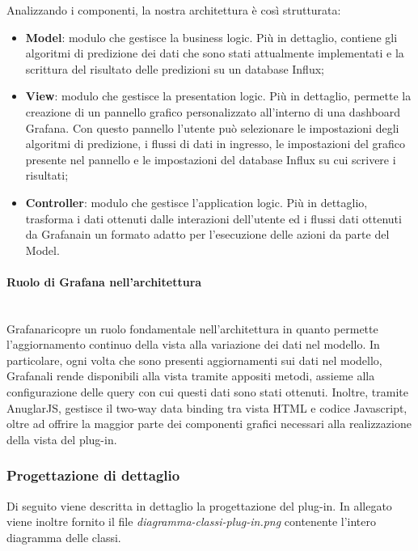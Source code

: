 Analizzando i componenti, la nostra architettura è così strutturata: 
\begin{itemize}
	\item \textbf{Model}: modulo che gestisce la business logic\glo. Più in dettaglio, contiene gli algoritmi di predizione dei dati che sono stati attualmente implementati e la scrittura del risultato delle predizioni su un database Influx;
	\item \textbf{View}: modulo che gestisce la presentation logic. Più in dettaglio, permette la creazione di un pannello grafico personalizzato all'interno di una dashboard Grafana\glo. Con questo pannello l'utente può selezionare le impostazioni degli algoritmi di predizione, i flussi di dati in ingresso, le impostazioni del grafico presente nel pannello e le impostazioni del database Influx su cui scrivere i risultati;
	\item \textbf{Controller}: modulo che gestisce l'application logic. Più in dettaglio, trasforma i dati ottenuti dalle interazioni dell'utente ed i flussi dati ottenuti da Grafana\glosp in un formato adatto per l'esecuzione delle azioni da parte del Model.
\end{itemize}
\paragraph{Ruolo di Grafana nell'architettura} \mbox{}\\ [1mm]
Grafana\glosp ricopre un ruolo fondamentale nell'architettura in quanto permette l'aggiornamento continuo della vista alla variazione dei dati nel modello. In particolare, ogni volta che sono presenti aggiornamenti sui dati nel modello, Grafana\glosp li rende disponibili alla vista tramite appositi metodi, assieme alla configurazione delle query con cui questi dati sono stati ottenuti. Inoltre, tramite AnuglarJS, gestisce il two-way data binding tra vista HTML e codice Javascript, oltre ad offrire la maggior parte dei componenti grafici necessari alla realizzazione della vista del plug-in.
\subsubsection{Progettazione di dettaglio}
Di seguito viene descritta in dettaglio la progettazione del plug-in. In allegato viene inoltre fornito il file \textit{diagramma-classi-plug-in.png} contenente l'intero diagramma delle classi.
